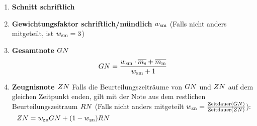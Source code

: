 \begin{enumerate}[label=\textbf{(\arabic*)}, align=left, leftmargin=*]
{\[	\,\,\,\,
	\wvzwei =
	\begin{cases}
		0 & \text{für }  \wdis \geq 1 \\
		\mhalf - \left | \wth \right | & \text{für }    \wdis < 1 \text{ und \defsn} \\
		\mhalf + \left | \wth \right | & \text{für }    \wdis < 1 \text{ und \defsnp} \\
	\end{cases}
	\]
	\vspace{-0.2cm}
	\[
	\wvdrei =
	\begin{cases}
		0 & \text{für } \wdis \geq 1\\
		\left | \frac{\wnull}{\wth}  \right | & \text{ansonsten}\\
	\end{cases}
	\,\hspace{0.5cm}\,
	\wvvier =
	\begin{cases}
		0 & \text{für }  \wdis \geq 1 \\
		\frac{\nveins \cdot \wveins + \nvo \cdot \mseins + \nvzwei \cdot \wvzwei}{\nvg} & \text{ansonsten}\\
	\end{cases}
	\]
	}
	\item \textbf{Schnitt schriftlich}
	\item \textbf{Gewichtungsfaktor schriftlich/mündlich} $w_{\mathrm{sm}}$ (Falls nicht anders mitgeteilt, ist $w_{\mathrm{sm}}=3$)
	\item \textbf{Gesamtnote $GN$}
	\vspace*{-0.5cm}
	\[
	GN = \frac{w_{\mathrm{sm}} \cdot \overline{m_{\mathrm{s}}} + \overline{m_{\mathrm{m}}}}{w_{\mathrm{sm}}+1}
	\]
	\item \textbf{Zeugnisnote $ZN$}
	{ \thisfontsize Falls die Beurteilungszeiträume von $GN$ und $ZN$ auf dem gleichen Zeitpunkt enden, gilt mit der Note aus dem restlichen Beurteilungszeitraum $RN$ (Falls nicht anders mitgeteilt $w_{\mathrm{zn}}=\frac{\mathrm{Zeitdauer}(GN) }{\mathrm{Zeitdauer}( ZN)}$): \,\,
	$	ZN = w_{\mathrm{zn}} GN + (1 - w_{\mathrm{zn}}) RN$}
\end{enumerate}

\renewcommand\refname{\footnotesize Quellen}
\renewcommand{\bibname}{Quellen}

\vfill


\begingroup
\tiny
\setlength{\bibsep}{0pt}


\endgroup
{}
